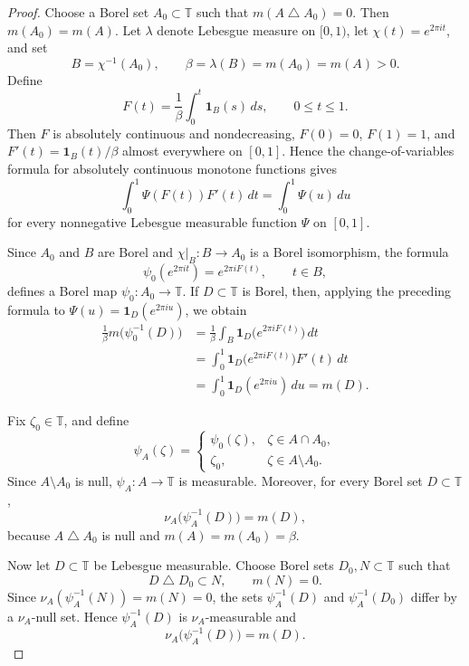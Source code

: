 \documentclass[10pt,a4paper]{amsart}
\newcommand{\T}{\mathbb{T}}
\begin{document}
\begin{proof}
Choose a Borel set \(A_0\subset\T\) such that
\( m(A\mathbin{\triangle}A_0)=0.
\)
Then \(m(A_0)=m(A)\). Let \(\lambda\) denote Lebesgue measure on
\([0,1)\), let \(\chi(t)=e^{2\pi it}\), and set
\[
        B=\chi^{-1}(A_0),
        \qquad
        \beta=\lambda(B)=m(A_0)=m(A)>0.
\]
Define
\[
        F(t)
        =
        \frac1\beta\int_0^t\mathbf1_B(s)\,ds,
        \qquad
        0\le t\le1.
\]
Then \(F\) is absolutely continuous and nondecreasing,
\(F(0)=0\), \(F(1)=1\), and
\(F'(t)=\mathbf1_B(t)/\beta\) almost everywhere on \([0,1]\).
Hence the change-of-variables formula for absolutely continuous
monotone functions \cite[p.~156]{Rudin1987} gives
\[
        \int_0^1 \Psi(F(t))F'(t)\,dt
        =
        \int_0^1 \Psi(u)\,du
\]
for every nonnegative Lebesgue measurable function
\(\Psi\) on \([0,1]\).

Since \(A_0\) and \(B\) are Borel and
\(\chi|_B:B\to A_0\) is a Borel isomorphism, the formula
\[
        \psi_0(e^{2\pi it})
        =
        e^{2\pi iF(t)},
        \qquad
        t\in B,
\]
defines a Borel map \(\psi_0:A_0\to\T\). If
\(D\subset\T\) is Borel, then, applying the preceding formula to
\(\Psi(u)=\mathbf1_D(e^{2\pi iu})\), we obtain
\[
\begin{aligned}
        \frac1{\beta}
        m\bigl(\psi_0^{-1}(D)\bigr)
        &=
        \frac1\beta
        \int_B
        \mathbf1_D\bigl(e^{2\pi iF(t)}\bigr)\,dt\\
        &=
        \int_0^1
        \mathbf1_D\bigl(e^{2\pi iF(t)}\bigr)F'(t)\,dt\\
        &=
        \int_0^1\mathbf1_D(e^{2\pi iu})\,du
        =
        m(D).
\end{aligned}
\]

Fix \(\zeta_0\in\T\), and define
\[
        \psi_A(\zeta)
        =
        \begin{cases}
        \psi_0(\zeta),
                & \zeta\in A\cap A_0,\\
        \zeta_0,
                & \zeta\in A\setminus A_0.
        \end{cases}
\]
Since \(A\setminus A_0\) is null, \(\psi_A:A\to\T\) is measurable.
Moreover, for every Borel set \(D\subset\T\),
\[
        \nu_A\bigl(\psi_A^{-1}(D)\bigr)
        =
        m(D),
\]
because \(A\mathbin{\triangle}A_0\) is null and
\(m(A)=m(A_0)=\beta\).

Now let \(D\subset\T\) be Lebesgue measurable. Choose Borel sets
\(D_0,N\subset\T\) such that
\[
        D\mathbin{\triangle}D_0\subset N,
        \qquad
        m(N)=0.
\]
Since
\(\nu_A(\psi_A^{-1}(N))=m(N)=0\), the sets
\(\psi_A^{-1}(D)\) and \(\psi_A^{-1}(D_0)\) differ by a
\(\nu_A\)-null set. Hence \(\psi_A^{-1}(D)\) is
\(\nu_A\)-measurable and
\[
        \nu_A\bigl(\psi_A^{-1}(D)\bigr)
        =
        m(D).
\]


\end{proof}
\end{document}
